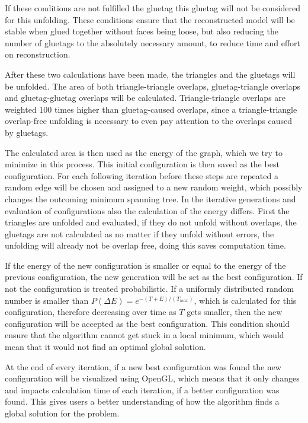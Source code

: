 \documentclass[draft,final]{vutinfth} %
\begin{document}
If these conditions are not fulfilled the gluetag this gluetag will not be considered for this unfolding. These conditions ensure that the reconstructed model will be stable when glued together without faces being loose, but also reducing the number of gluetags to the absolutely necessary amount, to reduce time and effort on reconstruction.

After these two calculations have been made, the triangles and the gluetags will be unfolded. The area of both triangle-triangle overlaps, gluetag-triangle overlaps and gluetag-gluetag overlaps will be calculated. Triangle-triangle overlaps are weighted 100 times higher than gluetag-caused overlaps, since a triangle-triangle overlap-free unfolding is necessary to even pay attention to the overlaps caused by gluetags.

The calculated area is then used as the energy of the graph, which we try to minimize in this process. This initial configuration is then saved as the best configuration. For each following iteration before these steps are repeated a random edge will be chosen and assigned to a new random weight, which possibly changes the outcoming minimum spanning tree. In the iterative generations and evaluation of configurations also the calculation of the energy differs. First the triangles are unfolded and evaluated, if they do not unfold without overlaps, the gluetags are not calculated as no matter if they unfold without errors, the unfolding will already not be overlap free, doing this saves computation time.

If the energy of the new configuration is smaller or equal to the energy of the previous configuration, the new generation will be set as the best configuration. If not the configuration is treated probabilistic. If a uniformly distributed random number is smaller than $P(\Delta E) = e^{-(T + E)/(T_{max})}$, which is calculated for this configuration, therefore decreasing over time as $T$ gets smaller, then the new configuration will be accepted as the best configuration. This condition should ensure that the algorithm cannot get stuck in a local minimum, which would mean that it would not find an optimal global solution.

At the end of every iteration, if a new best configuration was found the new configuration will be visualized using OpenGL, which means that it only changes and impacts calculation time of each iteration, if a better configuration was found. This gives users a better understanding of how the algorithm finds a global solution for the problem.
\end{document}
